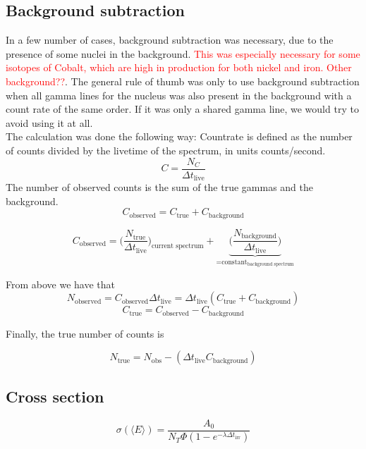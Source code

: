 \documentclass[a4paper,11pt,twoside]{book}
\begin{document}
\subsection{Background subtraction}

\noindent 
In a few number of cases, background subtraction was necessary, due to the presence of some nuclei in the background. \textcolor{red}{This was especially necessary for some isotopes of Cobalt, which are high in production for both nickel and iron. Other background??}. The general rule of thumb was only to use background subtraction when all gamma lines for the nucleus was also present in the background with a count rate of the same order. If it was only a shared gamma line, we would try to avoid using it at all. \\

\noindent 
The calculation was done the following way: 
Countrate is defined as the number of counts divided by the livetime of the spectrum, in units counts/second. 
$$C=\frac{N_C}{\Delta t_\text{live}}$$
The number of observed counts is the sum of the true gammas and the background. 
\begin{equation}
    C_\text{observed}=C_\text{true} + C_\text{background}
\end{equation}

\begin{equation}
C_\text{observed} = \Big(\frac{N_\text{true} }{\Delta t_\text{live}} \Big)_\text{current spectrum} + \underbrace{\Big( \frac{N_\text{background}}{\Delta t_\text{live}} \Big)}_\text{=constant} _\text{background spectrum}
\end{equation}


From above we have that 
\begin{equation}
    N_\text{observed}=C_\text{observed}\Delta t_\text{live} = \Delta t_\text{live}(C_\text{true}+C_\text{background})
\end{equation}
\begin{equation}
    C_\text{true} = C_\text{observed}-C_\text{background}
\end{equation}

Finally, the true number of counts is

\begin{equation}
    N_\text{true}=N_\text{obs}- (\Delta t_\text{live} C_\text{background})
\end{equation}


\subsection{Cross section}
\begin{equation} \label{eq:CS_ch3}
    \sigma(\langle E \rangle) = \frac{A_0}{N_T \Phi (1-e^{-\lambda \Delta t_\text{irr}})}
\end{equation}
\end{document}
